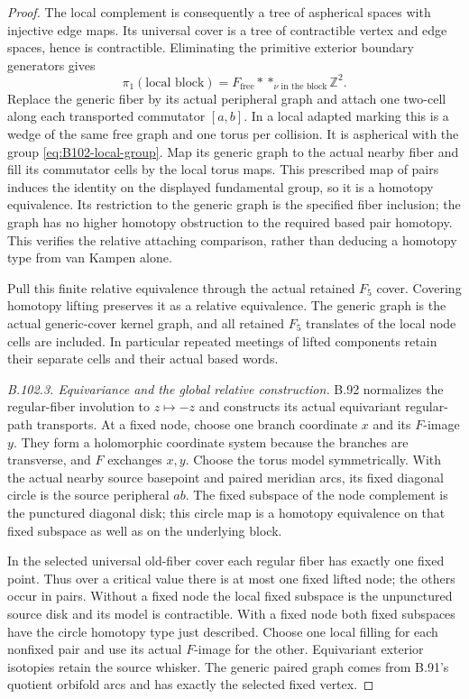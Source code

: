 \begin{proof}
The local complement is consequently a tree of aspherical spaces
with injective edge maps. Its universal cover is a tree of
contractible vertex and edge spaces, hence is contractible.
Eliminating the primitive exterior boundary generators gives
\begin{equation}\label{eq:B102-local-group}
 \pi_1(\text{local block})
      =F_{\mathrm{free}}*\mathop{*}_{\nu\text{ in the block}}\mathbb Z^2.
\end{equation}
Replace the generic fiber by its actual peripheral graph and attach
one two-cell along each transported commutator $[a,b]$. In a local
adapted marking this is a wedge of the same free graph and one
torus per collision. It is aspherical with the group
\eqref{eq:B102-local-group}. Map its generic graph to the actual
nearby fiber and fill its commutator cells by the local torus maps.
This prescribed map of pairs induces the identity on the displayed
fundamental group, so it is a homotopy equivalence. Its restriction
to the generic graph is the specified fiber inclusion; the graph
has no higher homotopy obstruction to the required based pair
homotopy. This verifies the relative attaching comparison, rather
than deducing a homotopy type from van Kampen alone.

Pull this finite relative equivalence through the actual retained
$F_5$ cover. Covering homotopy lifting preserves it as a relative
equivalence. The generic graph is the actual generic-cover kernel
graph, and all retained $F_5$ translates of the local node cells
are included. In particular repeated meetings of lifted components
retain their separate cells and their actual based words.

\emph{B.102.3. Equivariance and the global relative construction.}
B.92 normalizes the regular-fiber involution to $z\mapsto-z$
and constructs its actual equivariant regular-path transports.
At a fixed node, choose one branch coordinate $x$ and its $F$-image
$y$. They form a holomorphic coordinate system because the branches
are transverse, and $F$ exchanges $x,y$. Choose the torus model
symmetrically. With the actual nearby source basepoint and paired
meridian arcs, its fixed diagonal circle is the source peripheral
$ab$. The fixed subspace of the node complement is the punctured
diagonal disk; this circle map is a homotopy equivalence on that
fixed subspace as well as on the underlying block.

In the selected universal old-fiber cover each regular fiber has
exactly one fixed point. Thus over a critical value there is at
most one fixed lifted node; the others occur in pairs. Without a
fixed node the local fixed subspace is the unpunctured source disk
and its model is contractible. With a fixed node both fixed
subspaces have the circle homotopy type just described. Choose
one local filling for each nonfixed pair and use its actual
$F$-image for the other. Equivariant exterior isotopies retain the
source whisker. The generic paired graph comes from B.91's quotient
orbifold arcs and has exactly the selected fixed vertex.


\end{proof}
